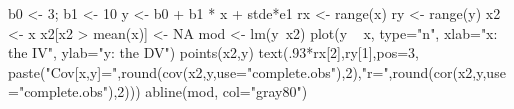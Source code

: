 \begin{Schunk}
\begin{Sinput}
 b0 <- 3; b1 <- 10
 y <- b0 + b1 * x + stde*e1
 rx <- range(x)
 ry <- range(y)
 x2 <- x
 x2[x2 > mean(x)] <- NA
 mod <- lm(y~x2)
 plot(y ~ x, type="n", xlab="x: the IV", ylab="y: the DV")
 points(x2,y)
 text(.93*rx[2],ry[1],pos=3, paste("Cov[x,y]=",round(cov(x2,y,use="complete.obs"),2),"\n r=",round(cor(x2,y,use="complete.obs"),2)))
 abline(mod, col="gray80")
\end{Sinput}
\end{Schunk}
